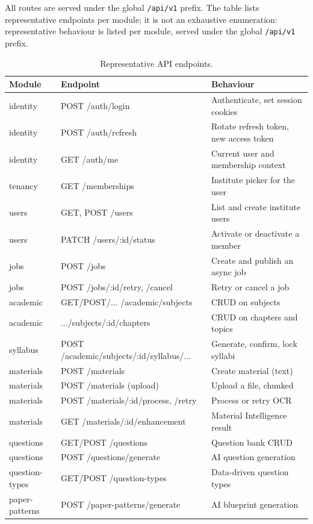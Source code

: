 All routes are served under the global \texttt{/api/v1} prefix. The table
lists representative endpoints per module; it is not an exhaustive
enumeration: representative behaviour is listed per module, served under the
global \texttt{/api/v1} prefix.

\begin{table}[H]
\centering
\caption{Representative API endpoints.}
\label{tab:api}
\small
\begin{tabular}{@{}p{3.2cm}p{5.2cm}p{\dimexpr\textwidth-8.4cm-24pt\relax}@{}}
\toprule
\textbf{Module} & \textbf{Endpoint} & \textbf{Behaviour} \\
\midrule
identity & POST /auth/login & Authenticate, set session cookies \\
identity & POST /auth/refresh & Rotate refresh token, new access token \\
identity & GET /auth/me & Current user and membership context \\
tenancy & GET /memberships & Institute picker for the user \\
users & GET, POST /users & List and create institute users \\
users & PATCH /users/:id/status & Activate or deactivate a member \\
jobs & POST /jobs & Create and publish an async job \\
jobs & POST /jobs/:id/retry, /cancel & Retry or cancel a job \\
academic & GET/POST/... /academic/subjects & CRUD on subjects \\
academic & .../subjects/:id/chapters & CRUD on chapters and topics \\
syllabus & POST /academic/subjects/:id/syllabus/... & Generate, confirm, lock syllabi \\
materials & POST /materials & Create material (text) \\
materials & POST /materials (upload) & Upload a file, chunked \\
materials & POST /materials/:id/process, /retry & Process or retry OCR \\
materials & GET /materials/:id/enhancement & Material Intelligence result \\
questions & GET/POST /questions & Question bank CRUD \\
questions & POST /questions/generate & AI question generation \\
question-types & GET/POST /question-types & Data-driven question types \\
paper-patterns & POST /paper-patterns/generate & AI blueprint generation \\

\end{tabular}
\end{table}
